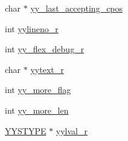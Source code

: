 \begin{DoxyCompactItemize}
\item 
char $\ast$ \hyperlink{structyyguts__t_a46fb8d232ed375921af0b37caeeb67c4}{yy\_\-last\_\-accepting\_\-cpos}
\item 
int \hyperlink{structyyguts__t_aa9f13776b8d311e847cc7d974d49af4c}{yylineno\_\-r}
\item 
int \hyperlink{structyyguts__t_a5ad72d75ed6d693824fe7e02ce21118e}{yy\_\-flex\_\-debug\_\-r}
\item 
char $\ast$ \hyperlink{structyyguts__t_aebaa731ad6cbe2411d104925e5bb3f2c}{yytext\_\-r}
\item 
int \hyperlink{structyyguts__t_a664a72171cc3e720fcb8120af9b72883}{yy\_\-more\_\-flag}
\item 
int \hyperlink{structyyguts__t_a683563bf4cd73f25b4c7b78579c1330e}{yy\_\-more\_\-len}
\item 
\hyperlink{union_y_y_s_t_y_p_e}{YYSTYPE} $\ast$ \hyperlink{structyyguts__t_a55dbdcd46a36d34adcbfc29be44d10cf}{yylval\_\-r}
\end{DoxyCompactItemize}


